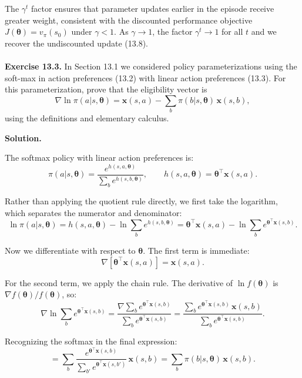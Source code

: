 \documentclass{article}
\begin{document}
The $\gamma^t$ factor ensures that parameter updates earlier in the episode receive greater
weight, consistent with the discounted performance objective $J(\boldsymbol{\theta}) = v_\pi(s_0)$
under $\gamma < 1$. As $\gamma \to 1$, the factor $\gamma^t \to 1$ for all $t$ and we recover
the undiscounted update (13.8).
\\\\
\textbf{Exercise 13.3.} In Section 13.1 we considered policy parameterizations using the
soft-max in action preferences (13.2) with linear action preferences (13.3). For this
parameterization, prove that the eligibility vector is
\[
  \nabla \ln \pi(a|s, \boldsymbol{\theta}) = \mathbf{x}(s, a) - \sum_b \pi(b|s, \boldsymbol{\theta})\,\mathbf{x}(s, b),
  \tag{13.9}
\]
using the definitions and elementary calculus.

\bigskip

\textbf{Solution.}

The softmax policy with linear action preferences is:
\[
  \pi(a|s, \boldsymbol{\theta}) = \frac{e^{h(s,a,\boldsymbol{\theta})}}{\sum_b e^{h(s,b,\boldsymbol{\theta})}},
  \qquad h(s, a, \boldsymbol{\theta}) = \boldsymbol{\theta}^\top \mathbf{x}(s, a).
\]

Rather than applying the quotient rule directly, we first take the logarithm, which
separates the numerator and denominator:
\[
  \ln \pi(a|s, \boldsymbol{\theta})
  = h(s, a, \boldsymbol{\theta}) - \ln \sum_b e^{h(s,b,\boldsymbol{\theta})}
  = \boldsymbol{\theta}^\top \mathbf{x}(s,a) - \ln \sum_b e^{\boldsymbol{\theta}^\top \mathbf{x}(s,b)}.
\]

Now we differentiate with respect to $\boldsymbol{\theta}$. The first term is immediate:
\[
  \nabla\left[\boldsymbol{\theta}^\top \mathbf{x}(s,a)\right] = \mathbf{x}(s,a).
\]

For the second term, we apply the chain rule. The derivative of $\ln f(\boldsymbol{\theta})$
is $\nabla f(\boldsymbol{\theta}) / f(\boldsymbol{\theta})$, so:
\[
  \nabla \ln \sum_b e^{\boldsymbol{\theta}^\top \mathbf{x}(s,b)}
  = \frac{\nabla \sum_b e^{\boldsymbol{\theta}^\top \mathbf{x}(s,b)}}{\sum_b e^{\boldsymbol{\theta}^\top \mathbf{x}(s,b)}}
  = \frac{\sum_b e^{\boldsymbol{\theta}^\top \mathbf{x}(s,b)}\, \mathbf{x}(s,b)}{\sum_b e^{\boldsymbol{\theta}^\top \mathbf{x}(s,b)}}.
\]

Recognizing the softmax in the final expression:
\[
  = \sum_b \frac{e^{\boldsymbol{\theta}^\top \mathbf{x}(s,b)}}{\sum_{b'} e^{\boldsymbol{\theta}^\top \mathbf{x}(s,b')}}\,\mathbf{x}(s,b)
  = \sum_b \pi(b|s, \boldsymbol{\theta})\,\mathbf{x}(s,b).
\]
\end{document}
